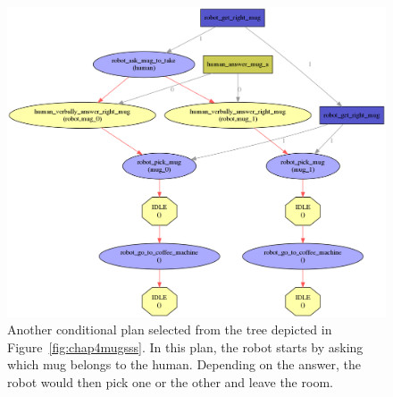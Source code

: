 \documentclass[a4paper,11pt,twoside]{StyleThese}
\begin{document}
\begin{figure}[hbtp]
\centering
\includegraphics[width=\textwidth]{figures/chapter4/mug_selection_ask.png}
\caption{Another conditional plan selected from the tree depicted in Figure~\ref{fig:chap4mugsss}. In this plan, the robot starts by asking which mug belongs to the human. Depending on the answer, the robot would then pick one or the other and leave the room.}
\label{fig:chap4mugask}
\end{figure}
\end{document}
